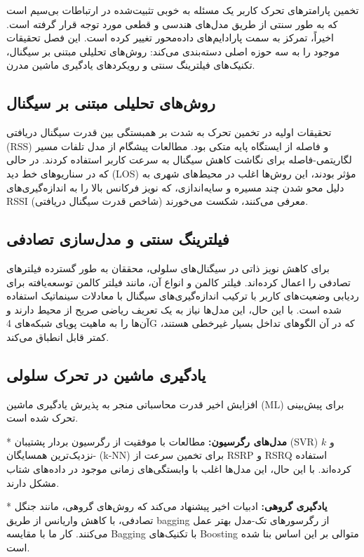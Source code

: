 \documentclass{CSICC}
\begin{document}
تخمین پارامترهای تحرک کاربر یک مسئله به خوبی تثبیت‌شده در ارتباطات بی‌سیم است که به طور سنتی از طریق مدل‌های هندسی و قطعی مورد توجه قرار گرفته است. اخیراً، تمرکز به سمت پارادایم‌های داده‌محور تغییر کرده است. این فصل تحقیقات موجود را به سه حوزه اصلی دسته‌بندی می‌کند: روش‌های تحلیلی مبتنی بر سیگنال، تکنیک‌های فیلترینگ سنتی و رویکردهای یادگیری ماشین مدرن.

\subsection{روش‌های تحلیلی مبتنی بر سیگنال}
تحقیقات اولیه در تخمین تحرک به شدت بر همبستگی بین قدرت سیگنال دریافتی (RSS) و فاصله از ایستگاه پایه متکی بود. مطالعات پیشگام از مدل تلفات مسیر لگاریتمی-فاصله برای نگاشت کاهش سیگنال به سرعت کاربر استفاده کردند. در حالی که در سناریوهای خط دید (LOS) مؤثر بودند، این روش‌ها اغلب در محیط‌های شهری به دلیل محو شدن چند مسیره و سایه‌اندازی، که نویز فرکانس بالا را به اندازه‌گیری‌های RSSI (شاخص قدرت سیگنال دریافتی) معرفی می‌کنند، شکست می‌خورند.

\subsection{فیلترینگ سنتی و مدل‌سازی تصادفی}
برای کاهش نویز ذاتی در سیگنال‌های سلولی، محققان به طور گسترده فیلترهای تصادفی را اعمال کرده‌اند. فیلتر کالمن و انواع آن، مانند فیلتر کالمن توسعه‌یافته برای ردیابی وضعیت‌های کاربر با ترکیب اندازه‌گیری‌های سیگنال با معادلات سینماتیک استفاده شده است. با این حال، این مدل‌ها نیاز به یک تعریف ریاضی صریح از محیط دارند و آن‌ها را به ماهیت پویای شبکه‌های 4G که در آن الگوهای تداخل بسیار غیرخطی هستند، کمتر قابل انطباق می‌کند.

\subsection{یادگیری ماشین در تحرک سلولی}
افزایش اخیر قدرت محاسباتی منجر به پذیرش یادگیری ماشین (ML) برای پیش‌بینی تحرک شده است.

* \textbf{مدل‌های رگرسیون:} مطالعات با موفقیت از رگرسیون بردار پشتیبان (SVR) و \(k\)-نزدیک‌ترین همسایگان (k-NN) برای تخمین سرعت از RSRP و RSRQ استفاده کرده‌اند. با این حال، این مدل‌ها اغلب با وابستگی‌های زمانی موجود در داده‌های شتاب مشکل دارند.

* \textbf{یادگیری گروهی:} ادبیات اخیر پیشنهاد می‌کند که روش‌های گروهی، مانند جنگل تصادفی، با کاهش واریانس از طریق bagging از رگرسورهای تک-مدل بهتر عمل می‌کنند. کار ما با مقایسه Bagging با تکنیک‌های Boosting متوالی بر این اساس بنا شده است.
\end{document}
